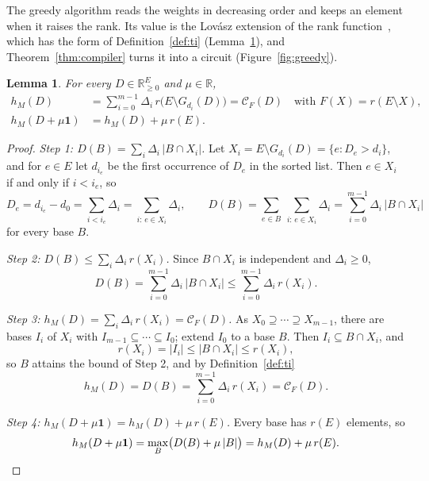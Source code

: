 \documentclass[11pt]{article}
\newtheorem{lemma}[theorem]{Lemma}
\newcommand{\R}{\mathbb R}
\newcommand{\CC}{\mathcal C}
\begin{document}
The greedy algorithm reads the weights in decreasing order and keeps an element
when it raises the rank.  Its value is the Lov\'asz extension of the rank
function~\cite{edmonds70,lovasz83}, which has the form of Definition~\ref{def:ti}
(Lemma~\ref{lem:greedy}), and Theorem~\ref{thm:compiler} turns it into a circuit
(Figure~\ref{fig:greedy}).

\begin{lemma}
\label{lem:greedy}
For every $D\in\R^{E}_{\ge0}$ and $\mu\in\R$,
\begin{align*}
  h_M(D)&=\sum_{i=0}^{m-1}\Delta_i\,r\bigl(E\setminus G_{d_i}(D)\bigr)=\CC_F(D)
  \quad\text{with }F(X)=r(E\setminus X),\\
  h_M(D+\mu\mathbf 1)&=h_M(D)+\mu\,r(E).
\end{align*}
\end{lemma}

\begin{proof}
\emph{Step 1: $D(B)=\sum_i\Delta_i\,|B\cap X_i|$.}  Let $X_i=E\setminus G_{d_i}(D)=\{e:D_e>d_i\}$, and for
$e\in E$ let $d_{i_e}$ be the first occurrence of $D_e$ in the sorted list.  Then
$e\in X_i$ if and only if $i<i_e$, so
\[
  D_e=d_{i_e}-d_0=\sum_{i<i_e}\Delta_i=\sum_{i:\,e\in X_i}\Delta_i,
  \qquad
  D(B)=\sum_{e\in B}\ \sum_{i:\,e\in X_i}\Delta_i=\sum_{i=0}^{m-1}\Delta_i\,|B\cap X_i|
\]
for every base $B$.

\emph{Step 2: $D(B)\le\sum_i\Delta_i\,r(X_i)$.}  Since $B\cap X_i$ is independent and $\Delta_i\ge0$,
\[
  D(B)=\sum_{i=0}^{m-1}\Delta_i\,|B\cap X_i|\le\sum_{i=0}^{m-1}\Delta_i\,r(X_i).
\]

\emph{Step 3: $h_M(D)=\sum_i\Delta_i\,r(X_i)=\CC_F(D)$.}  As $X_0\supseteq\cdots\supseteq X_{m-1}$,
there are bases $I_i$ of $X_i$ with $I_{m-1}\subseteq\cdots\subseteq I_0$; extend
$I_0$ to a base $B$.  Then $I_i\subseteq B\cap X_i$, and
\[
  r(X_i)=|I_i|\le|B\cap X_i|\le r(X_i),
\]
so $B$ attains the bound of Step 2, and by Definition~\ref{def:ti}
\[
  h_M(D)=D(B)=\sum_{i=0}^{m-1}\Delta_i\,r(X_i)=\CC_F(D).
\]

\emph{Step 4: $h_M(D+\mu\mathbf 1)=h_M(D)+\mu\,r(E)$.}  Every base has $r(E)$ elements, so
\[
  h_M(D+\mu\mathbf 1)=\max_{B}\bigl(D(B)+\mu\,|B|\bigr)=h_M(D)+\mu\,r(E).\qedhere
\]
\end{proof}
\end{document}
